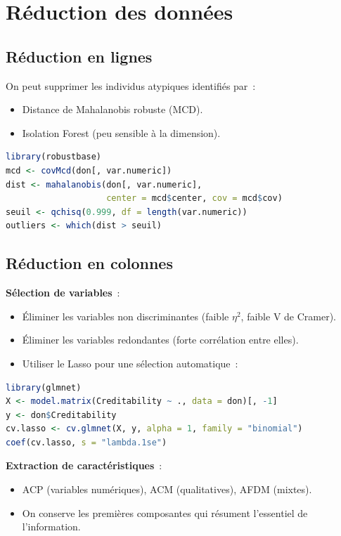 \documentclass[a4paper,11pt]{article}
\theoremstyle{definition}
\theoremstyle{remark}
\begin{document}
\section{Réduction des données}

\subsection{Réduction en lignes}

On peut supprimer les individus atypiques identifiés par~:
\begin{itemize}
  \item Distance de Mahalanobis robuste (MCD).
  \item Isolation Forest (peu sensible à la dimension).
\end{itemize}

\begin{lstlisting}[language=R]
library(robustbase)
mcd <- covMcd(don[, var.numeric])
dist <- mahalanobis(don[, var.numeric],
                    center = mcd$center, cov = mcd$cov)
seuil <- qchisq(0.999, df = length(var.numeric))
outliers <- which(dist > seuil)
\end{lstlisting}

\subsection{Réduction en colonnes}

\textbf{Sélection de variables}~:
\begin{itemize}
  \item Éliminer les variables non discriminantes (faible $\eta^2$,
    faible V de Cramer).
  \item Éliminer les variables redondantes (forte corrélation entre
    elles).
  \item Utiliser le Lasso pour une sélection automatique~:
\end{itemize}

\begin{lstlisting}[language=R]
library(glmnet)
X <- model.matrix(Creditability ~ ., data = don)[, -1]
y <- don$Creditability
cv.lasso <- cv.glmnet(X, y, alpha = 1, family = "binomial")
coef(cv.lasso, s = "lambda.1se")
\end{lstlisting}

\textbf{Extraction de caractéristiques}~:
\begin{itemize}
  \item ACP (variables numériques), ACM (qualitatives), AFDM (mixtes).
  \item On conserve les premières composantes qui résument
    l'essentiel de l'information.
\end{itemize}
\end{document}
